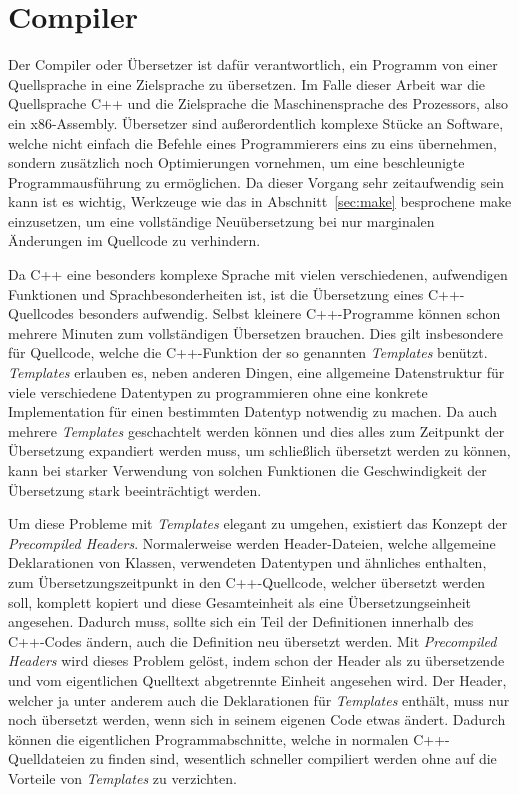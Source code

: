 \section{Compiler}
\label{sec:compiler}
Der Compiler oder Übersetzer ist dafür verantwortlich, ein Programm von einer Quellsprache in eine Zielsprache zu übersetzen. Im Falle dieser Arbeit war die Quellsprache C++ und die
Zielsprache die Maschinensprache des Prozessors, also ein x86-Assembly. Übersetzer sind außerordentlich komplexe Stücke an Software, welche nicht einfach die Befehle eines Programmierers eins zu
eins übernehmen, sondern zusätzlich noch Optimierungen vornehmen, um eine beschleunigte Programmausführung zu ermöglichen. Da dieser Vorgang sehr zeitaufwendig sein kann ist es wichtig, Werkzeuge wie
das in Abschnitt~\ref{sec:make} besprochene make einzusetzen, um eine vollständige Neuübersetzung bei nur marginalen Änderungen im Quellcode zu verhindern. 

Da C++ eine besonders komplexe Sprache mit vielen verschiedenen, aufwendigen Funktionen und Sprachbesonderheiten ist, ist die Übersetzung eines C++-Quellcodes besonders aufwendig. Selbst kleinere
C++-Programme können schon mehrere Minuten zum vollständigen Übersetzen brauchen. Dies gilt insbesondere für Quellcode, welche die C++-Funktion der so genannten \textit{Templates} benützt. \textit{Templates}
erlauben es, neben anderen Dingen, eine allgemeine Datenstruktur für viele verschiedene Datentypen zu programmieren ohne eine konkrete Implementation für einen bestimmten Datentyp notwendig zu machen.
Da auch mehrere \textit{Templates} geschachtelt werden können und dies alles zum Zeitpunkt der Übersetzung expandiert werden muss, um schließlich übersetzt werden zu können, kann bei starker Verwendung
von solchen Funktionen die Geschwindigkeit der Übersetzung stark beeinträchtigt werden.

Um diese Probleme mit \textit{Templates} elegant zu umgehen, existiert das Konzept der \textit{Precompiled Headers}. Normalerweise werden Header-Dateien, welche allgemeine Deklarationen von Klassen, verwendeten Datentypen
und ähnliches enthalten, zum Übersetzungszeitpunkt in den C++-Quellcode, welcher übersetzt werden soll, komplett kopiert und diese Gesamteinheit als eine Über\-setzungs\-einheit angesehen. Dadurch muss, sollte
sich ein Teil der Definitionen innerhalb des C++-Codes ändern, auch die Definition neu übersetzt werden. Mit \textit{Precompiled Headers} wird dieses Problem gelöst, indem schon der Header als zu übersetzende und vom eigentlichen Quelltext abgetrennte Einheit angesehen wird. Der Header, welcher ja unter anderem auch die Deklarationen für \textit{Templates} enthält, muss nur noch
übersetzt werden, wenn sich in seinem eigenen Code etwas ändert. Dadurch können die eigentlichen Programmabschnitte, welche in normalen C++-Quelldateien zu finden sind, wesentlich schneller
compiliert werden ohne auf die Vorteile von \textit{Templates} zu verzichten.


